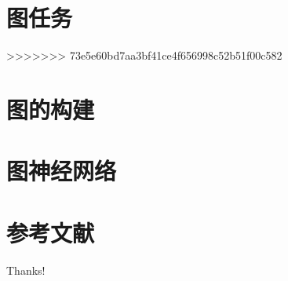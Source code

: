 \documentclass{beamer}
\begin{document}
\section{图任务}
>>>>>>> 73e5e60bd7aa3bf41ce4f656998c52b51f00c582

\begin{frame}

\end{frame}

\section{图的构建}

\begin{frame}

\end{frame}

\section{图神经网络}

\begin{frame}

\end{frame}

\section{参考文献}

\begin{frame}[allowframebreaks]
    
    
\end{frame}

\begin{frame}
    \begin{center}
        {\Huge\calligra Thanks!}
    \end{center}
\end{frame}
\end{document}
